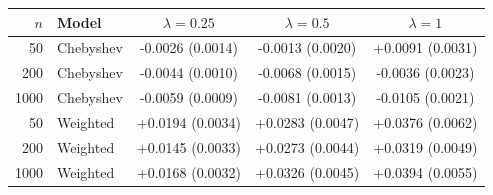 \begin{tabular}{rlccc}\toprule
$n$ & Model & $\lambda{=}0.25$ & $\lambda{=}0.5$ & $\lambda{=}1$\\\midrule
50 & Chebyshev & -0.0026 (0.0014) & -0.0013 (0.0020) & +0.0091 (0.0031)\\
200 & Chebyshev & -0.0044 (0.0010) & -0.0068 (0.0015) & -0.0036 (0.0023)\\
1000 & Chebyshev & -0.0059 (0.0009) & -0.0081 (0.0013) & -0.0105 (0.0021)\\
50 & Weighted & +0.0194 (0.0034) & +0.0283 (0.0047) & +0.0376 (0.0062)\\
200 & Weighted & +0.0145 (0.0033) & +0.0273 (0.0044) & +0.0319 (0.0049)\\
1000 & Weighted & +0.0168 (0.0032) & +0.0326 (0.0045) & +0.0394 (0.0055)\\
\bottomrule\end{tabular}